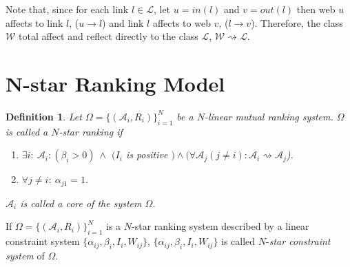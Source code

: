 \documentclass[10pt,leqno,twoside]{article}
\newtheorem{definition}{\indent Definition}[section]
\begin{document}
Note that, since for each link $l\in \mathcal{L}$, let $u=in(l)$ and $v=out(l)$ then web $u$ affects to link $l$, ($u\rightarrow l$) and link $l$ affects to web $v$, ($l\rightarrow v$). Therefore, the class $\mathcal{W}$ total affect and reflect directly to the class $\mathcal{L}$, $\mathcal{W} \rightsquigarrow \mathcal{L}$.


\section{N-star Ranking Model}\label{Sect:N-star}

\begin{definition}
Let $\Omega = \{(\mathcal{A}_i,R_i)\}^N_{i=1}$ be a $N$-linear mutual ranking system. $\Omega$ is called a $N$-\emph{star ranking} if
\begin{enumerate}
\item $\exists i :~ \mathcal{A}_i: (\beta_i >0)~\wedge$ $(I_i$ is positive $)\wedge (\forall \mathcal{A}_j(j\neq i): \mathcal{A}_i\rightsquigarrow\mathcal{A}_j$).
\item $\forall j\neq i :~ \alpha_{j1} = 1.$
\end{enumerate}
$\mathcal{A}_i$ is called a \emph{core} of the system $\Omega$.
\end{definition}

If $\Omega = \{(\mathcal{A}_i,R_i)\}^N_{i=1}$ is a $N$-star ranking system described by a linear constraint system $\{\alpha_{ij},\beta_{i},I_i,W_{ij}\}$, $\{\alpha_{ij},\beta_{i},I_i,W_{ij}\}$ is called $N$-\emph{star constraint system} of $\Omega$.
\end{document}
